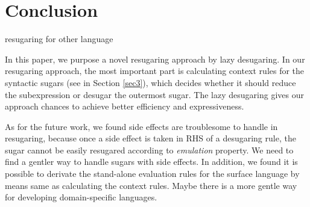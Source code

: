 \section{Conclusion}
\label{sec7}

resugaring for other language

In this paper, we purpose a novel resugaring approach by lazy desugaring.
In our resugaring approach, the most important part is calculating context rules for the syntactic sugars (see in Section \ref{sec3}), which decides whether it should reduce the subexpression or desugar the outermost sugar. The lazy desugaring gives our approach chances to achieve better efficiency and expressiveness.



As for the future work, we found side effects are troublesome to handle in resugaring, because once a side effect is taken in RHS of a desugaring rule, the sugar cannot be easily resugared according to \emph{emulation} property. We need to find a gentler way to handle sugars with side effects. In addition, we found it is possible to derivate the stand-alone evaluation rules for the surface language by means same as calculating the context rules. Maybe there is a more gentle way for developing domain-specific languages.
